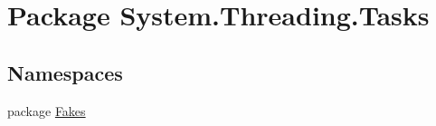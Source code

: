 \hypertarget{namespace_system_1_1_threading_1_1_tasks}{\section{Package System.\-Threading.\-Tasks}
\label{namespace_system_1_1_threading_1_1_tasks}
}
\subsection*{Namespaces}
\begin{DoxyCompactItemize}
\item 
package \hyperlink{namespace_system_1_1_threading_1_1_tasks_1_1_fakes}{Fakes}
\end{DoxyCompactItemize}
